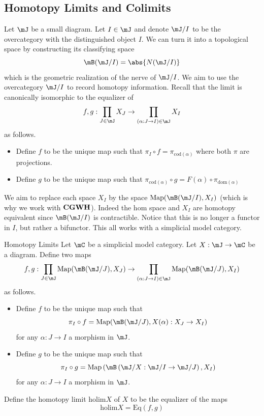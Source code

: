 \documentclass[a4paper]{article}
\begin{document}
\subsection{Homotopy Limits and Colimits}
Let $\mJ$ be a small diagram. Let $I\in\mJ$ and denote $\mJ/I$ to be the overcategory with the distinguished object $I$. We can turn it into a topological space by constructing its classifying space $$\mB(\mJ/I)=\abs{N(\mJ/I)}$$ which is the geometric realization of the nerve of $\mJ/I$. We aim to use the overcategory $\mJ/I$ to record homotopy information. Recall that the limit is canonically isomorphic to the equalizer of $$f,g:\prod_{J\in\mJ}X_J\to\prod_{(\alpha:J\to I)\in\mJ}X_I$$ as follows. 
\begin{itemize}
\item Define $f$ to be the unique map such that $\pi_I\circ f=\pi_{\text{cod}(\alpha)}$ where both $\pi$ are projections. 
\item Define $g$ to be the unique map such that $\pi_{\text{cod}(\alpha)}\circ g=F(\alpha)\circ\pi_{\text{dom}(\alpha)}$
\end{itemize}
We aim to replace each space $X_I$ by the space $\text{Map}(\mB(\mJ/I),X_I)$ (which is why we work with $\bold{CGWH}$). Indeed the hom space and $X_I$ are homotopy equivalent since $\mB(\mJ/I)$ is contractible. Notice that this is no longer a functor in $I$, but rather a bifunctor. This all works with a simplicial model category. 

\begin{defn}{Homotopy Limits}{} Let $\mC$ be a simplicial model category. Let $X:\mJ\to\mC$ be a diagram. Define two maps $$f,g:\prod_{J\in\mJ}\text{Map}(\mB(\mJ/J),X_J)\to\prod_{(\alpha:J\to I)\in\mJ}\text{Map}(\mB(\mJ/J),X_I)$$ as follows. 
\begin{itemize}
\item Define $f$ to be the unique map such that $$\pi_I\circ f=\text{Map}(\mB(\mJ/J),X(\alpha):X_J\to X_I)$$ for any $\alpha:J\to I$ a morphism in $\mJ$. 
\item Define $g$ to be the unique map such that $$\pi_I\circ g=\text{Map}\left(\mB\left(\mJ/X:\mJ/I\to\mJ/J\right),X_I\right)$$ for any $\alpha:J\to I$ a morphism in $\mJ$. 
\end{itemize}
Define the homotopy limit $\text{holim}X$ of $X$ to be the equalizer of the maps $$\text{holim}X=\text{Eq}(f,g)$$
\end{defn}
\end{document}
